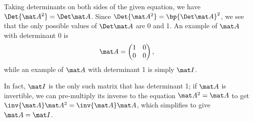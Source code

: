 \begin{solution}
    \begin{ppart}
        Taking determinants on both sides of the given equation, we have $\Det{\mat A^2} = \Det \mat A$. Since $\Det{\mat A^2} = \bp{\Det \mat A}^2$, we see that the only possible values of $\Det \mat A $ are 0 and 1. An example of $\mat A$ with determinant 0 is \[\mat A = \begin{pmatrix}1 & 0 \\ 0 & 0\end{pmatrix},\] while an example of $\mat A$ with determinant 1 is simply $\mat I$.

        In fact, $\mat I$ is the only such matrix that has determinant 1; if $\mat A$ is invertible, we can pre-multiply its inverse to the equation $\mat A^2 = \mat A$ to get $\inv{\mat A} \mat A^2 = \inv{\mat A} \mat A$, which simplifies to give $\mat A = \mat I$.
        

\end{ppart}
\end{solution}
